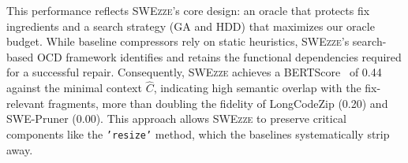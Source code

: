 \documentclass[sigconf,nonacm]{acmart}
\newcommand{\haoxiang}[1]{{\color{red}\textbf{(Haoxiang:} #1\textbf{)}}}
\newcommand{\projName}{\textsc{SWEzze}\xspace}
\begin{document}



This performance reflects \projName's core design: an oracle that protects fix ingredients and a search strategy (GA and HDD) that maximizes our oracle budget. While baseline compressors rely on static heuristics, \projName's search-based OCD framework identifies and retains the functional dependencies required for a successful repair. Consequently, \projName achieves a BERTScore~\cite{DBLP:conf/iclr/ZhangKWWA20} of 0.44 against the minimal context $\hat{C}$, indicating high semantic overlap with the fix-relevant fragments, more than doubling the fidelity of LongCodeZip (0.20) and SWE-Pruner (0.00). This approach allows \projName to preserve critical components like the \texttt{'resize'} method, which the baselines systematically strip away.
\end{document}
